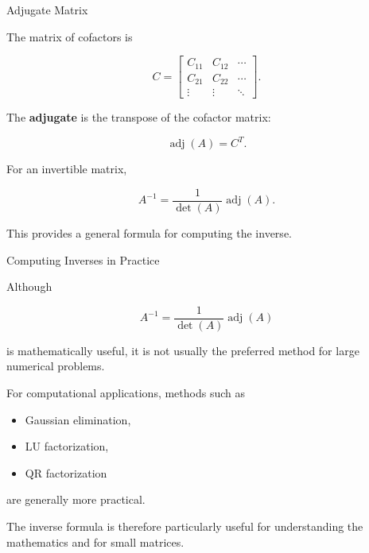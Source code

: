 
\begin{frame}{Adjugate Matrix}

The matrix of cofactors is

\[
C=
\begin{bmatrix}
C_{11}&C_{12}&\cdots\\
C_{21}&C_{22}&\cdots\\
\vdots&\vdots&\ddots
\end{bmatrix}.
\]

The \textbf{adjugate} is the transpose of the cofactor matrix:

\[
\boxed{
\operatorname{adj}(A)=C^T.
}
\]

For an invertible matrix,

\[
\boxed{
A^{-1}
=
\frac{1}{\det(A)}
\operatorname{adj}(A).
}
\]

This provides a general formula for computing the inverse.

\end{frame}



\begin{frame}{Computing Inverses in Practice}

Although

\[
A^{-1}
=
\frac{1}{\det(A)}
\operatorname{adj}(A)
\]

is mathematically useful, it is not usually the preferred
method for large numerical problems.

\vspace{0.4cm}

For computational applications, methods such as

\begin{itemize}
    \item Gaussian elimination,
    \item LU factorization,
    \item QR factorization
\end{itemize}

are generally more practical.

\vspace{0.4cm}

The inverse formula is therefore particularly useful for
understanding the mathematics and for small matrices.

\end{frame}